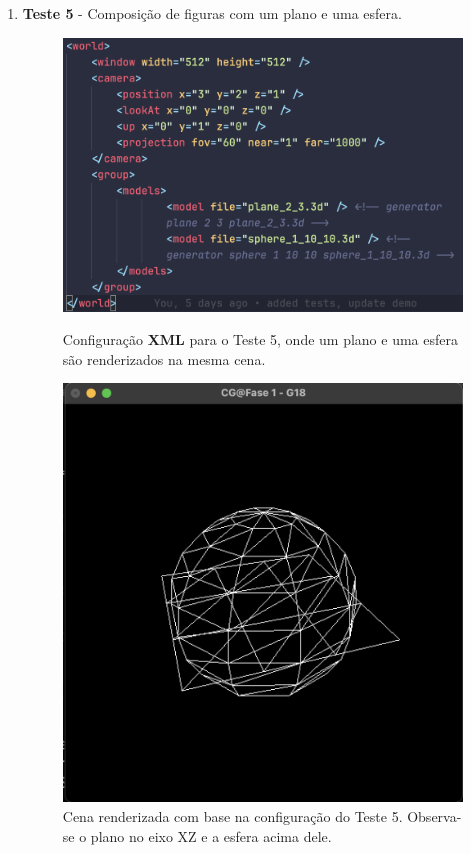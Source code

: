 \documentclass[12pt,a4paper]{report}%
\begin{document}
\begin{enumerate}
\newpage

\item \textbf{Teste 5} - Composição de figuras com um plano e uma esfera.
    \begin{figure}[H]
    \centering
    \begin{minipage}{0.49\linewidth}
        \centering
        \includegraphics[width=\linewidth]{images/xmlTeste5.png}
        \caption[Teste 5 - XML]{Configuração \textbf{XML} para o Teste 5, onde um plano e uma esfera são renderizados na mesma cena.}
        \label{fig:xml-teste5}
    \end{minipage}
    \hfill
    \begin{minipage}{0.49\linewidth}
        \centering
        \includegraphics[width=\linewidth]{images/Teste5.png}
        \caption[Teste 5 - Desenho] {Cena renderizada com base na configuração do Teste 5. Observa-se o plano no eixo XZ e a esfera acima dele.}
        \label{fig:cena-teste5}
    \end{minipage}
\end{figure}





\end{enumerate}
\end{document}
